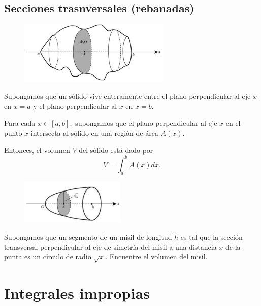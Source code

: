 \subsection{Secciones trasnversales (rebanadas)}


\begin{figure}
 \centering
 \includegraphics[height=3cm,keepaspectratio=true]{./calculo/fig3008.png}
 \label{fig:3008}
\end{figure}


Supongamos que un s\'olido vive enteramente entre el plano perpendicular al eje $x$ en $x=a$ y el plano perpendicular al  $x$ en $x=b.$ 

Para cada $x\in [a,b],$ supongamos que el plano perpendicular al eje $x$ en el punto $x$ intersecta al s\'olido en una regi\'on de área $A(x).$



Entonces, el volumen $V$ del s\'olido está dado por 
\begin{equation}
 \label{fst}
 \tag{FST}
 V=\int_{a}^{b}A(x)dx.
\end{equation}


\begin{problema}
\begin{figure}
 \centering
 \includegraphics[width=5cm,keepaspectratio=true]{./calculo/fig3009.png}
 \label{fig:3009}
\end{figure}

 Supongamos que un segmento de un misil de longitud $h$ es tal que la secci\'on transversal perpendicular al eje de simetr\'ia del misil a una distancia $x$ de la punta  es un c\'irculo de radio $\sqrt{x}.$ Encuentre el volumen del misil.
\end{problema}



\section{Integrales impropias}

